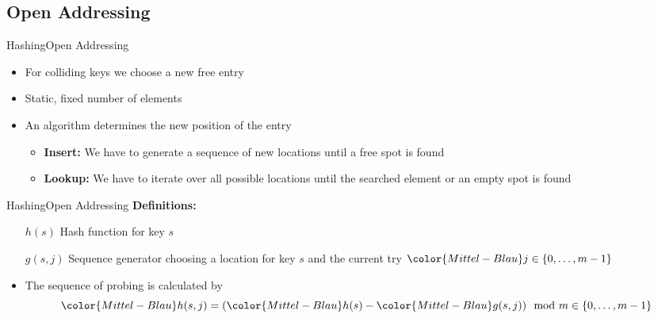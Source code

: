 
\subsection{Open Addressing}

\begin{frame}{Hashing}{Open Addressing}
  \begin{itemize}
    \item
      For colliding keys we choose a new free entry
    \item
      Static, fixed number of elements
    \item
      An algorithm determines the new position of the entry
    \begin{itemize}
      \item
        \textbf{Insert:}
        We have to generate a sequence of new locations until a free spot is
        found
      \item
        \textbf{Lookup:}
        We have to iterate over all possible locations until the searched
        element or an empty spot is found
    \end{itemize}
  \end{itemize}
\end{frame}


\begin{frame}{Hashing}{Open Addressing}
  \textbf{Definitions:}
  \begin{itemize}
    \item[\color{Mittel-Blau}$h(s)$]
      Hash function for key {\color{Mittel-Blau}$s$}
    \item[\color{Mittel-Blau}$g(s,j)$]
      Sequence generator choosing a location for key {\color{Mittel-Blau}$s$}
      and the current try ${\color{Mittel-Blau}j} \in \{0,\dots,m-1\}$
    \item
      The sequence of probing is calculated by
      \begin{displaymath}
        {\color{Mittel-Blau}h(s,j)}
        = ({\color{Mittel-Blau}h(s)} - {\color{Mittel-Blau}g(s,j)})
        \mod m \in \{0,\dots,m-1\}
      \end{displaymath}
  \end{itemize}
\end{frame}


